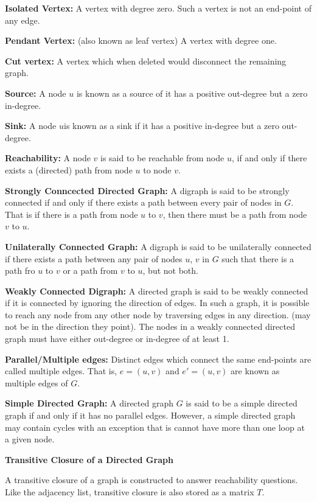 \vskip 3mm
{\bf Isolated Vertex:} A vertex with degree zero. Such a vertex is not an end-point of any edge.

\vskip 3mm
{\bf Pendant Vertex:} (also known as leaf vertex) A vertex with degree one.

\vskip 3mm
{\bf Cut vertex:} A vertex which when deleted would disconnect the remaining graph.

\vskip 3mm
{\bf Source:} A node $u$ is known as a source of it has a positive out-degree but a zero in-degree.

\vskip 3mm
{\bf Sink:} A node $u$is known as a sink if it has a positive in-degree but a zero out-degree.

\vskip 3mm
{\bf Reachability:} A node $v$ is said to be reachable from node $u$, if and only if there exists a (directed) path from  node $u$ to node $v$.

\vskip 3mm
{\bf Strongly Conncected Directed Graph:} A digraph is said to be strongly connected if and only if there exists a path between every pair of nodes in $G$. That is if there is a path from node $u$ to $v$, then there must be a path from node $v$ to $u$.

\vskip 3mm
{\bf Unilaterally Connected Graph:} A digraph is said to be unilaterally connected if there exists a path between any pair of nodes $u$, $v$ in $G$ such that there is a path fro $u$ to $v$ or a path from $v$ to $u$, but not both.

\vskip 3mm
{\bf Weakly Connected Digraph:} A directed graph is said to be weakly connected if it is connected by ignoring the direction of edges. In such a graph, it is possible to reach any node from any other node by traversing edges in any direction. (may not be in the direction they point). The nodes in a weakly connected directed graph must have either out-degree or in-degree of at least 1.

\vskip 3mm
{\bf Parallel/Multiple edges:} Distinct edges which connect the same end-points are called multiple edges. That is, $e=(u,v)$ and $e'=(u,v)$ are known as multiple edges of $G$.

\vskip 3mm
{\bf Simple Directed Graph:} A directed graph $G$ is said to be a simple directed graph if and only if it has no parallel edges. However, a simple directed graph may contain cycles with an exception that is cannot have more than one loop at a given node.

\filbreak
\vskip 1cm
{\bf Transitive Closure of a Directed Graph}

\vskip 1mm
A transitive closure of a graph is constructed to answer reachability questions. Like the adjacency list, transitive closure is also stored as a matrix $T$.

